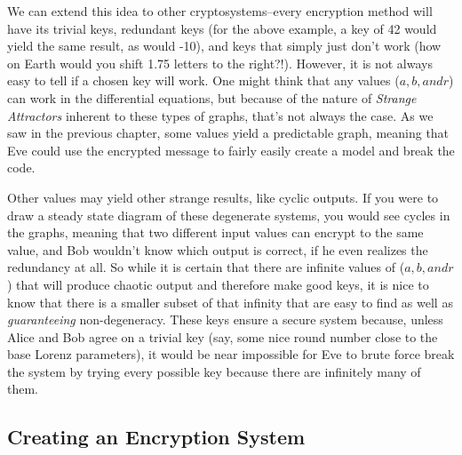 We can extend this idea to other cryptosystems--every encryption method will have its trivial keys, redundant keys (for the above example, a key of 42 would yield the same result, as would -10), and keys that simply just don't work (how on Earth would you shift 1.75 letters to the right?!).  However, it is not always easy to tell if a chosen key will work.  One might think that any values ($a, b, and r$) can work in the differential equations, but because of the nature of \textit{Strange Attractors} inherent to these types of graphs, that's not always the case.  As we saw in the previous chapter, some values yield a predictable graph,  meaning that Eve could use the encrypted message to fairly easily create a model and break the code.  

Other values may yield other strange results, like cyclic outputs.  If you were to draw a steady state diagram of these degenerate systems, you would see cycles in the graphs, meaning that two different input values can encrypt to the same value, and Bob wouldn't know which output is correct, if he even realizes the redundancy at all.  So while it is certain that there are infinite values of ($a, b, and r$) that will produce chaotic output and therefore make good keys, it is nice to know that there is a smaller subset of that infinity that are easy to find as well as \textit{guaranteeing} non-degeneracy.  These keys ensure a secure system because, unless Alice and Bob agree on a trivial key (say, some nice round number close to the base Lorenz parameters), it would be near impossible for Eve to brute force break the system by trying every possible key because there are infinitely many of them.

\subsection{Creating an Encryption System}

